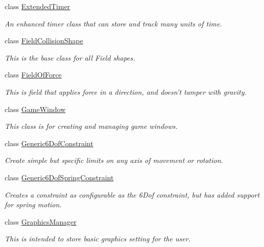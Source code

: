\begin{DoxyCompactItemize}
class \hyperlink{classMezzanine_1_1ExtendedTimer}{ExtendedTimer}
\begin{DoxyCompactList}\small\item\em An enhanced timer class that can store and track many units of time. \item\end{DoxyCompactList}\item 
class \hyperlink{classMezzanine_1_1FieldCollisionShape}{FieldCollisionShape}
\begin{DoxyCompactList}\small\item\em This is the base class for all Field shapes. \item\end{DoxyCompactList}\item 
class \hyperlink{classMezzanine_1_1FieldOfForce}{FieldOfForce}
\begin{DoxyCompactList}\small\item\em This is field that applies force in a direction, and doesn't tamper with gravity. \item\end{DoxyCompactList}\item 
class \hyperlink{classMezzanine_1_1GameWindow}{GameWindow}
\begin{DoxyCompactList}\small\item\em This class is for creating and managing game windows. \item\end{DoxyCompactList}\item 
class \hyperlink{classMezzanine_1_1Generic6DofConstraint}{Generic6DofConstraint}
\begin{DoxyCompactList}\small\item\em Create simple but specific limits on any axis of movement or rotation. \item\end{DoxyCompactList}\item 
class \hyperlink{classMezzanine_1_1Generic6DofSpringConstraint}{Generic6DofSpringConstraint}
\begin{DoxyCompactList}\small\item\em Creates a constraint as configurable as the 6Dof constraint, but has added support for spring motion. \item\end{DoxyCompactList}\item 
class \hyperlink{classMezzanine_1_1GraphicsManager}{GraphicsManager}
\begin{DoxyCompactList}\small\item\em This is intended to store basic graphics setting for the user. \item\end{DoxyCompactList}\item 

\end{DoxyCompactItemize}
